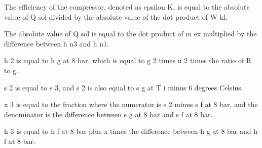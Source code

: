 The efficiency of the compressor, denoted as epsilon K, is equal to the absolute value of Q sol divided by the absolute value of the dot product of W kl.

The absolute value of Q sol is equal to the dot product of m ex multiplied by the difference between h n3 and h n1.

h 2 is equal to h g at 8 bar, which is equal to g 2 times u 2 times the ratio of R to g.

s 2 is equal to s 3, and s 2 is also equal to s g at T i minus 6 degrees Celsius.

x 3 is equal to the fraction where the numerator is s 2 minus s f at 8 bar, and the denominator is the difference between s g at 8 bar and s f at 8 bar.

h 3 is equal to h f at 8 bar plus x times the difference between h g at 8 bar and h f at 8 bar.